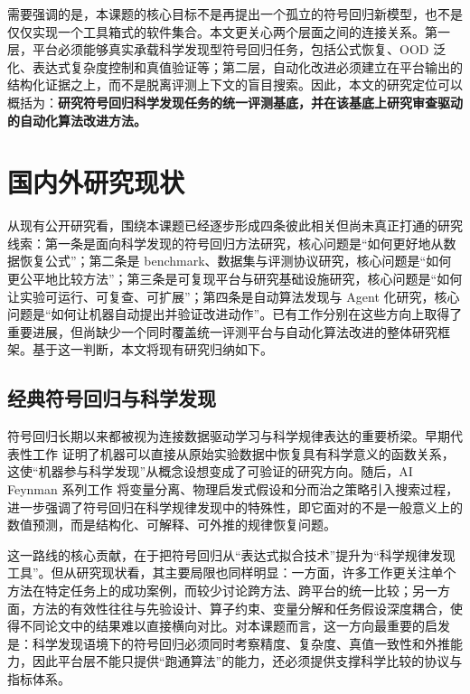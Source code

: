 \documentclass[UTF8,12pt]{ctexart}
\begin{document}
需要强调的是，本课题的核心目标不是再提出一个孤立的符号回归新模型，也不是仅仅实现一个工具箱式的软件集合。本文更关心两个层面之间的连接关系。第一层，平台必须能够真实承载科学发现型符号回归任务，包括公式恢复、OOD 泛化、表达式复杂度控制和真值验证等；第二层，自动化改进必须建立在平台输出的结构化证据之上，而不是脱离评测上下文的盲目搜索。因此，本文的研究定位可以概括为：\textbf{研究符号回归科学发现任务的统一评测基底，并在该基底上研究审查驱动的自动化算法改进方法。}

\section{国内外研究现状}

\noindent 从现有公开研究看，围绕本课题已经逐步形成四条彼此相关但尚未真正打通的研究线索：第一条是面向科学发现的符号回归方法研究，核心问题是“如何更好地从数据恢复公式”；第二条是 benchmark、数据集与评测协议研究，核心问题是“如何更公平地比较方法”；第三条是可复现平台与研究基础设施研究，核心问题是“如何让实验可运行、可复查、可扩展”；第四条是自动算法发现与 Agent 化研究，核心问题是“如何让机器自动提出并验证改进动作”。已有工作分别在这些方向上取得了重要进展，但尚缺少一个同时覆盖统一评测平台与自动化算法改进的整体研究框架。基于这一判断，本文将现有研究归纳如下。

\subsection{经典符号回归与科学发现}

符号回归长期以来都被视为连接数据驱动学习与科学规律表达的重要桥梁。早期代表性工作 \citet{schmidt2009distilling} 证明了机器可以直接从原始实验数据中恢复具有科学意义的函数关系，这使“机器参与科学发现”从概念设想变成了可验证的研究方向。随后，AI Feynman 系列工作 \citep{udrescu2020aifeynman,udrescu2020aifeynman2} 将变量分离、物理启发式假设和分而治之策略引入搜索过程，进一步强调了符号回归在科学规律发现中的特殊性，即它面对的不是一般意义上的数值预测，而是结构化、可解释、可外推的规律恢复问题。

这一路线的核心贡献，在于把符号回归从“表达式拟合技术”提升为“科学规律发现工具”。但从研究现状看，其主要局限也同样明显：一方面，许多工作更关注单个方法在特定任务上的成功案例，而较少讨论跨方法、跨平台的统一比较；另一方面，方法的有效性往往与先验设计、算子约束、变量分解和任务假设深度耦合，使得不同论文中的结果难以直接横向对比。对本课题而言，这一方向最重要的启发是：科学发现语境下的符号回归必须同时考察精度、复杂度、真值一致性和外推能力，因此平台层不能只提供“跑通算法”的能力，还必须提供支撑科学比较的协议与指标体系。
\end{document}
